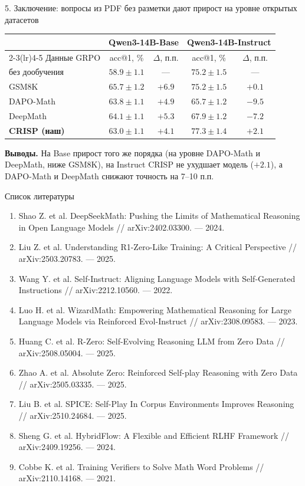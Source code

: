 \documentclass[aspectratio=169]{beamer}
\begin{document}
\begin{frame}{5. Заключение: вопросы из PDF без разметки дают прирост на уровне открытых датасетов}
\centering
\small
\begin{tabular}{lcccc}
\toprule
& \multicolumn{2}{c}{Qwen3-14B-Base} & \multicolumn{2}{c}{Qwen3-14B-Instruct} \\
\cmidrule(lr){2-3}\cmidrule(lr){4-5}
Данные GRPO & acc@1, \% & $\Delta$, п.п. & acc@1, \% & $\Delta$, п.п. \\
\midrule
без дообучения & $58.9 \pm 1.1$ & --- & $75.2 \pm 1.5$ & --- \\
GSM8K & $65.7 \pm 1.2$ & $+6.9$ & $75.2 \pm 1.5$ & $+0.1$ \\
DAPO-Math & $63.8 \pm 1.1$ & $+4.9$ & $65.7 \pm 1.2$ & $-9.5$ \\
DeepMath & $64.1 \pm 1.1$ & $+5.3$ & $67.9 \pm 1.2$ & $-7.2$ \\
\textbf{CRISP (наш)} & $\mathbf{63.0 \pm 1.1}$ & $\mathbf{+4.1}$ & $\mathbf{77.3 \pm 1.4}$ & $\mathbf{+2.1}$ \\
\bottomrule
\end{tabular}

\vspace{8pt}
\raggedright
\textbf{Выводы.} На Base прирост того же порядка (на уровне DAPO-Math и DeepMath, ниже GSM8K), на Instruct CRISP не ухудшает модель ($+2.1$), а DAPO-Math и DeepMath снижают точность на 7--10 п.п.
\end{frame}

\begin{frame}{Список литературы}
\scriptsize
\begin{enumerate}
\item Shao Z. et al. DeepSeekMath: Pushing the Limits of Mathematical Reasoning in Open Language Models // arXiv:2402.03300. --- 2024.
\item Liu Z. et al. Understanding R1-Zero-Like Training: A Critical Perspective // arXiv:2503.20783. --- 2025.
\item Wang Y. et al. Self-Instruct: Aligning Language Models with Self-Generated Instructions // arXiv:2212.10560. --- 2022.
\item Luo H. et al. WizardMath: Empowering Mathematical Reasoning for Large Language Models via Reinforced Evol-Instruct // arXiv:2308.09583. --- 2023.
\item Huang C. et al. R-Zero: Self-Evolving Reasoning LLM from Zero Data // arXiv:2508.05004. --- 2025.
\item Zhao A. et al. Absolute Zero: Reinforced Self-play Reasoning with Zero Data // arXiv:2505.03335. --- 2025.
\item Liu B. et al. SPICE: Self-Play In Corpus Environments Improves Reasoning // arXiv:2510.24684. --- 2025.
\item Sheng G. et al. HybridFlow: A Flexible and Efficient RLHF Framework // arXiv:2409.19256. --- 2024.
\item Cobbe K. et al. Training Verifiers to Solve Math Word Problems // arXiv:2110.14168. --- 2021.
\end{enumerate}
\end{frame}
\end{document}
